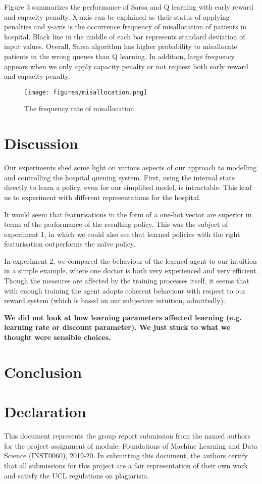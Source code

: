 \documentclass[11point]{article}
\newcommand{\note}[1]{\textbf{#1}}
\begin{document}
Figure 3 summarizes the performance of Sarsa and Q learning with early reward and capacity penalty. X-axis can be explained as their status of applying penalties and y-axis is the occurrence frequency of misallocation of patients in hospital. Black line in the middle of each bar represents standard deviation of input values. Overall, Sarsa algorithm has higher probability to misallocate patients in the wrong queues than Q learning. In addition, large frequency appears when we only apply capacity penalty or not request both early reward and capacity penalty.

\begin{figure}
    \centering
    \texttt{[image: figures/misallocation.png]}
    \caption{The frequency rate of misallocation}
    \label{fig:penalty_diagram}
\end{figure}


\section{Discussion}
Our experiments shed some light on various aspects of our approach to modelling and controlling the hospital queuing system.
First, using the internal state directly to learn a policy, even for our simplified model, is intractable. This lead us to experiment with different representations for the hospital.

It would seem that featurisations in the form of a one-hot vector are superior in terms of the performance of the resulting policy.
This was the subject of experiment 1, in which we could also see that learned policies with the right featurisation outperforms the naïve policy.

In experiment 2, we compared the behaviour of the learned agent to our intuition in a simple example, where one doctor is both very experienced and very efficient.
Though the measures are affected by the training processes itself, it seems that with enough training the agent adopts coherent behaviour with respect to our reward system (which is based on our subjective intuition, admittedly).


\note{We did not look at how learning parameters affected learning (e.g. learning rate or discount parameter). We just stuck to what we thought were sensible choices.}
\section{Conclusion}


\section*{Declaration}
This document represents the group report submission from the named authors for the project assignment of module: Foundations of Machine Learning and Data Science (INST0060), 2019-20. In submitting this document, the authors certify that all submissions for this project are a fair representation of their own work and satisfy the UCL regulations on  plagiarism.



\end{document}
